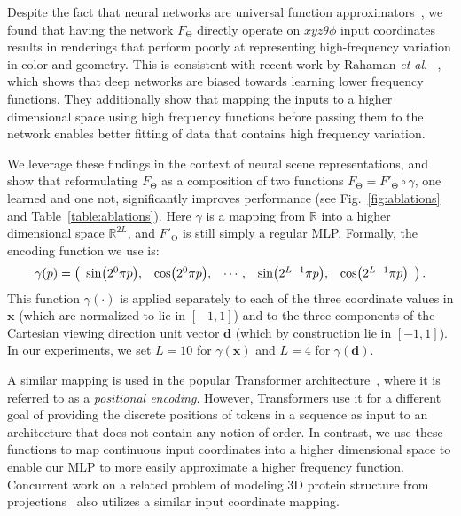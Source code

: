 \documentclass[runningheads]{llncs}
\let\originalleft\left
\let\originalright\right
\renewcommand{\left}{\mathopen{}\mathclose\bgroup\originalleft}
\renewcommand{\right}{\aftergroup\egroup\originalright}
\newcommand{\etal}{\textit{et al}. }
\newcommand{\modeltheta}{\mathrm{\Theta}}
\newcommand{\posxyz}{xyz}
\newcommand{\angletheta}{\theta}
\newcommand{\anglephi}{\phi}
\newcommand{\posall}{\posxyz\angletheta\anglephi}
\newcommand{\numfrequencies}{L}
\begin{document}
Despite the fact that neural networks are universal function approximators~\cite{universal}, we found that having the network $F_\modeltheta$ directly operate on $\posall$ input coordinates results in renderings that perform poorly at representing high-frequency variation in color and geometry. This is consistent with recent work by Rahaman \etal~\cite{rahaman2018}, which shows that deep networks are biased towards learning lower frequency functions. They additionally show that mapping the inputs to a higher dimensional space using high frequency functions before passing them to the network enables better fitting of data that contains high frequency variation.

\newcommand{\dummypos}{p}

We leverage these findings in the context of neural scene representations, and show that reformulating $F_\modeltheta$ as a composition of two functions ${F_\modeltheta = F'_\modeltheta \circ \gamma }$, one learned and one not, significantly improves performance (see Fig.~\ref{fig:ablations} and Table~\ref{table:ablations}).
Here $\gamma$ is a mapping from $\mathbb{R}$ into a higher dimensional space $\mathbb{R}^{2\numfrequencies}$, and $F'_\modeltheta$ is still simply a regular MLP. Formally, the encoding function we use is: 
\begin{equation}
    \gamma(\dummypos) = \left(
    \begin{array}{ccccc}
    \sin\left(2^0 \pi \dummypos\right), &
    \cos\left(2^0 \pi \dummypos\right), &
    \cdots, &
    \sin\left(2^{\numfrequencies-1} \pi \dummypos\right), &
    \cos\left(2^{\numfrequencies-1} \pi \dummypos\right)
    \end{array} \right) \,.
\label{eq:enc}
\end{equation}
This function $\gamma(\cdot)$ is applied separately to each of the three coordinate values in $\mathbf{x}$ (which are normalized to lie in $[-1, 1]$) and to the three components of the Cartesian viewing direction unit vector $\mathbf{d}$ (which by construction lie in $[-1, 1]$). 
In our experiments, we set $L=10$ for $\gamma(\mathbf x)$ and $L=4$ for $\gamma(\mathbf d)$. 

A similar mapping is used in the popular Transformer architecture~\cite{transformer}, where it is referred to as a \emph{positional encoding}. However, Transformers use it for a different goal of providing the discrete positions of tokens in a sequence as input to an architecture that does not contain any notion of order. In contrast, we use these functions to map continuous input coordinates into a higher dimensional space to enable our MLP to more easily approximate a higher frequency function. Concurrent work on a related problem of modeling 3D protein structure from projections~\cite{cryoem} also utilizes a similar input coordinate mapping.
\end{document}
